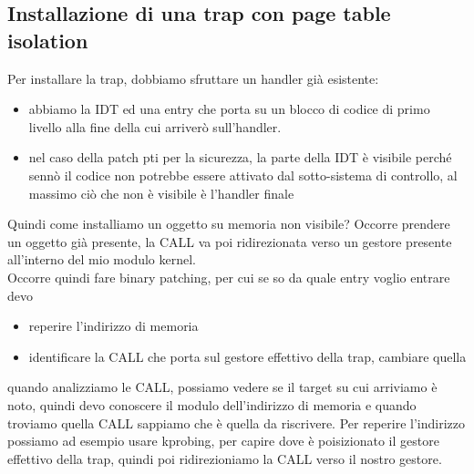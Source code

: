 \documentclass[12pt, oneside]{extbook}
\begin{document}
\subsection{Installazione di una trap con page table isolation}
Per installare la trap, dobbiamo sfruttare un handler già esistente:
\begin{itemize}
\item abbiamo la IDT ed una entry che porta su un blocco di codice di primo livello alla fine della cui arriverò sull'handler.
\item nel caso della patch pti per la sicurezza, la parte della IDT è visibile perché sennò il codice non potrebbe essere attivato dal sotto-sistema di controllo, al massimo ciò che non è visibile è l'handler finale
\end{itemize} 
Quindi come installiamo un oggetto su memoria non visibile? Occorre prendere un oggetto già presente, la CALL va poi ridirezionata verso un gestore presente all'interno del mio modulo kernel.\\Occorre quindi fare binary patching, per cui se so da quale entry voglio entrare devo
\begin{itemize}
\item reperire l'indirizzo di memoria
\item identificare la CALL che porta sul gestore effettivo della trap, cambiare quella
\end{itemize}
quando analizziamo le CALL, possiamo vedere se il target su cui arriviamo è noto, quindi devo conoscere il modulo dell'indirizzo di memoria e quando troviamo quella CALL sappiamo che è quella da riscrivere. Per reperire l'indirizzo possiamo ad esempio usare kprobing, per capire dove è poisizionato il gestore effettivo della trap, quindi poi ridirezioniamo la CALL verso il nostro gestore.
\end{document}
